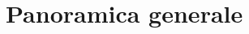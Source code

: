 \documentclass[../ClipsManualeUtente.tex]{subfiles}
\begin{document}
\section{Panoramica generale}
\end{document}
